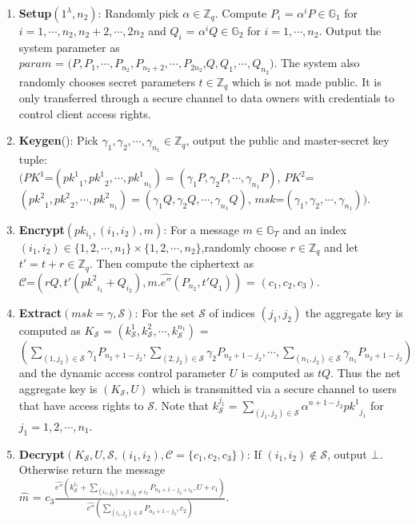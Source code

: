 \begin{enumerate}
 \item \textbf{Setup}$(1^{\lambda},n_2)$: Randomly pick $\alpha \in \mathbb{Z}_q$. Compute $P_i$ = ${\alpha^{i}}P \in \mathbb{G}_1$ for $i = 1,\cdots,n_2,n_2+2,\cdots,2n_2$ and $Q_i$ = ${\alpha^{i}}Q \in \mathbb{G}_2$ for $i = 1,\cdots,n_2$. Output the system parameter as\\
 $param$ = $(P,P_1,\cdots,P_{n_2},P_{n_2+2},\cdots,P_{2n_2}$,$Q,Q_1,\cdots,Q_{n_2})$. The system also randomly chooses secret parameters $t \in \mathbb{Z}_q$ which is not made public. It is only transferred through a secure channel to data owners with credentials to control client access rights.
 \item \textbf{Keygen}(): Pick $\gamma_1,\gamma_2,\cdots,\gamma_{n_1} \in \mathbb{Z}_q$, output the public and master-secret key tuple:\\ $(PK^1$=$({pk^1}_1,{pk^1}_{2},\cdots,{pk^1}_{n_1})=(\gamma_1P,\gamma_2P,\cdots,\gamma_{n_1}P)$, $PK^2$=\\$({pk^2}_1,{pk^2}_{2},\cdots,{pk^2}_{n_1})=(\gamma_1Q,\gamma_2Q,\cdots,\gamma_{n_1}Q)$, $msk$=$(\gamma_1,\gamma_2,\cdots,\gamma_{n_1}))$.
 
 \item \textbf{Encrypt}$(pk_{i_1},(i_1,i_2),m)$: For a message $m \in \mathbb{G}_T$ and an index $(i_1,i_2) \in \{1,2,\cdots,n_1\}\times\{1,2,\cdots,n_2\}$,randomly choose $r\in\mathbb{Z}_q$ and let $t'=t+r \in\mathbb{Z}_q$. Then compute the ciphertext as\\
 $\mathcal{C}$=$(rQ,t'({pk^2}_{i_1}+Q_{i_2}),m.\hat{e''}(P_{n_2},t'Q_1))$ = $(c_1,c_2,c_3)$.
 \item \textbf{Extract}$(msk=\gamma,\mathcal{S})$: For the set $\mathcal{S}$ of indices $(j_1,j_2)$ the aggregate key is computed as $K_{\mathcal{S}}$ = $(k^{1}_{\mathcal{S}},k^{2}_{\mathcal{S}},\cdots,k^{n_1}_{\mathcal{S}})$ =\\ $(\sum_{(1,j_2)\in\mathcal{S}}{\gamma_{1}}P_{n_2+1-j_2},\sum_{(2,j_2)\in\mathcal{S}}{\gamma_{2}}P_{n_2+1-j_2},\cdots,\sum_{(n_1,j_2)\in\mathcal{S}}{\gamma_{n_1}}P_{n_2+1-j_2})$\\ and the dynamic access control parameter $U$ is computed as $tQ$. Thus the net aggregate key is $(K_{\mathcal{S}},U)$ which is transmitted via a secure channel to users that have access rights to $\mathcal{S}$. Note that  $k^{j_1}_{\mathcal{S}}=\sum_{(j_1,j_2)\in\mathcal{S}}\alpha^{n+1-j_2}{pk^1}_{j_1}$ for $j_1=1,2,\cdots,n_1$. 
 \item \textbf{Decrypt}$(K_{\mathcal{S}}, U, \mathcal{S},(i_1,i_2),\mathcal{C}=\{c_1,c_2,c_3\})$: If $(i_1,i_2)\notin\mathcal{S}$, output $\bot$. Otherwise return the message\\ $\hat{m}$ = $c_3\frac{\hat{e''}(k^{i_1}_{\mathcal{S}}+\sum_{(i_1,j_2)\in\mathcal{S},j_2\neq i_2}P_{n_2+1-j_2+i_2},U+c_1)}{\hat{e''}(\sum_{(i_1,j_2)\in\mathcal{S}}P_{n_2+1-j_2},c_2)}$. 
\end{enumerate}

